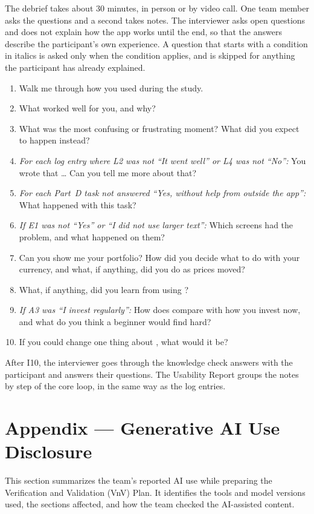 \documentclass[12pt, titlepage]{article}
\begin{document}
The debrief takes about 30 minutes, in person or by video call. One team
member asks the questions and a second takes notes. The interviewer asks open
questions and does not explain how the app works until the end, so that the
answers describe the participant's own experience.
A question that starts with a condition in italics is asked only when the
condition applies, and is skipped for anything the participant has already
explained.

{\renewcommand{\labelenumi}{I\arabic{enumi}.}
\renewcommand{\theenumi}{I\arabic{enumi}}
\begin{enumerate}
  \item Walk me through how you used \progname{} during the study.
  \item What worked well for you, and why?
  \item What was the most confusing or frustrating moment? What did you expect
    to happen instead?
  \item \emph{For each log entry where L2 was not ``It went well'' or L4 was not
    ``No'':} You wrote that \ldots{} Can you tell me more about that?
  \item \emph{For each Part~D task not answered ``Yes, without help from
    outside the app'':} What happened with this task?
  \item \emph{If E1 was not ``Yes'' or ``I did not use larger text'':} Which
    screens had the problem, and what happened on them?
  \item Can you show me your portfolio? How did you decide what to do with
    your currency, and what, if anything, did you do as prices moved?
  \item What, if anything, did you learn from using \progname{}?
  \item \emph{If A3 was ``I invest regularly'':} How does \progname{} compare
    with how you invest now, and what do you think a beginner would find hard?
  \item If you could change one thing about \progname{}, what would it be?
\end{enumerate}}

After I10, the interviewer goes through the knowledge check answers with the
participant and answers their questions. The Usability Report groups the notes
by step of the core loop, in the same way as the log entries.

\clearpage

\section{Appendix --- Generative AI Use Disclosure}
This section summarizes the team's reported AI use while preparing the Verification and Validation (VnV) Plan. It identifies the tools and model versions used, the sections affected, and how the team checked the AI-assisted content.
\end{document}
